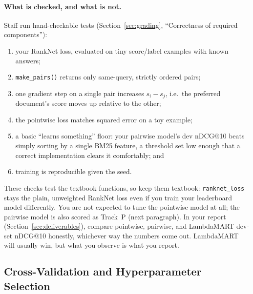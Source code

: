 \documentclass[10pt]{article}
\begin{document}
\paragraph{What is checked, and what is not.}
Staff run hand-checkable tests (Section~\ref{sec:grading}, ``Correctness of required components''):
\begin{enumerate}
  \item[(a)] your RankNet loss, evaluated on tiny score/label examples with known answers;
  \item[(b)] \texttt{make\_pairs()} returns only same-query, strictly ordered pairs;
  \item[(c)] one gradient step on a single pair increases \(s_i - s_j\), i.e.\ the preferred document's score moves up relative to the other;
  \item[(d)] the pointwise loss matches squared error on a toy example;
  \item[(e)] a basic ``learns something'' floor: your pairwise model's dev nDCG@10 beats simply sorting by a single BM25 feature, a threshold set low enough that a correct implementation clears it comfortably; and
  \item[(f)] training is reproducible given the seed.
\end{enumerate}
These checks test the textbook functions, so keep them textbook: \texttt{ranknet\_loss} stays the plain, unweighted RankNet loss even if you train your leaderboard model differently. You are not expected to tune the pointwise model at all; the pairwise model is also scored as Track~P (next paragraph). In your report (Section~\ref{sec:deliverables}), compare pointwise, pairwise, and LambdaMART dev-set nDCG@10 honestly, whichever way the numbers come out. LambdaMART will usually win, but what you observe is what you report.



\subsection{Cross-Validation and Hyperparameter Selection}
\label{sec:cv}
\end{document}
